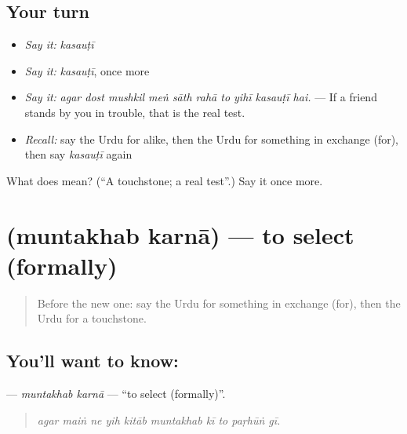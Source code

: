 \subsection*{Your turn}
\begin{itemize}
\raggedright
  \item \emph{Say it:} \emph{kasauṭī}
  \item \emph{Say it:} \emph{kasauṭī}, once more
  \item \emph{Say it:} \emph{agar dost mushkil meṅ sāth rahā to yihī kasauṭī hai.} — If a friend stands by you in trouble, that is the real test.
  \item \emph{Recall:} say the Urdu for alike, then the Urdu for something in exchange (for), then say \emph{kasauṭī} again
\end{itemize}

\begin{tcolorbox}[breakable,colback=teal!4,colframe=teal!35!black,title={Before you move on}]
What does  mean? (\textquotedblleft{}A touchstone; a real test\textquotedblright{}.) Say it once more.
\end{tcolorbox}
\section[\texorpdfstring{\ur{منتخب} \ur{کرنا} (muntakhab karnā)}{منتخب کرنا (muntakhab karnā)}]{  (muntakhab karnā) — to select (formally)}

\label{lesson:UR-C537-muntakhab-karna}



\begin{quote}
Before the new one: say the Urdu for something in exchange (for), then the Urdu for a touchstone.
\end{quote}

\subsection*{You'll want to know:  }
\textbf{ } — \emph{muntakhab karnā} — \textquotedblleft{}to select (formally)\textquotedblright{}.

\begin{quote}
         
\end{quote}

\begin{quote}
\emph{agar maiṅ ne yih kitāb muntakhab kī to paṛhūṅ gī.}
\end{quote}

